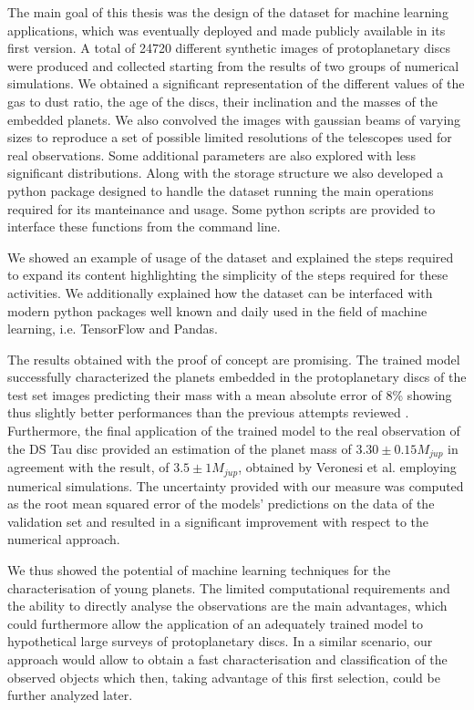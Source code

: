 \documentclass[a4paper,10pt]{report}
\begin{document}
The main goal of this thesis was the design of the dataset for machine learning applications,
which was eventually deployed and made publicly available in its first version. A total of 24720 different synthetic
images of protoplanetary discs were produced and collected starting from the results of two groups of numerical simulations.
We obtained a significant representation of the different values of the gas to dust ratio, the age of the discs,
their inclination and the masses of the embedded 
planets. We also convolved the images with gaussian beams of varying sizes to reproduce a set of possible limited resolutions
of the telescopes used for real observations. 
Some additional parameters are also explored with less significant distributions.
Along with the storage structure we also developed a python package designed to handle the dataset
running the main operations required for its manteinance and usage. 
Some python scripts are provided to interface these functions
from the command line.

We showed an example of usage of the dataset and explained the steps required to expand its content
highlighting the simplicity of the steps required for these activities.
We additionally explained how the dataset can be interfaced with modern python packages
well known and daily used in the field
of machine learning, i.e. TensorFlow and Pandas.

The results obtained with the proof of concept are promising. The trained model successfully
characterized the planets embedded in the protoplanetary discs of the test set images predicting their mass
with a mean absolute error of 8\% showing thus slightly better performances
than the previous attempts reviewed \cite{Auddy_2020}.
Furthermore, the final application of the trained model to the real observation of the DS Tau disc
provided an estimation of the planet mass of $3.30 \pm 0.15 M_{jup}$ in agreement with the result, of
$3.5 \pm 1 M_{jup}$,
obtained by Veronesi et al. \cite{dstauv} employing numerical simulations. The uncertainty provided 
with our measure was computed as the root mean squared error of the models' predictions on the data of the validation
set and resulted in a significant improvement with respect to the numerical approach.

We thus showed the potential of machine learning techniques for the characterisation of 
young planets. The limited computational requirements and the ability to
directly analyse the observations are the main advantages, which could
furthermore allow the application of an adequately trained model to hypothetical large surveys
of protoplanetary discs. In a similar scenario, our approach would allow to obtain a fast characterisation
and classification of the observed objects which then, taking advantage of this first selection,
could be further analyzed later.
\end{document}
